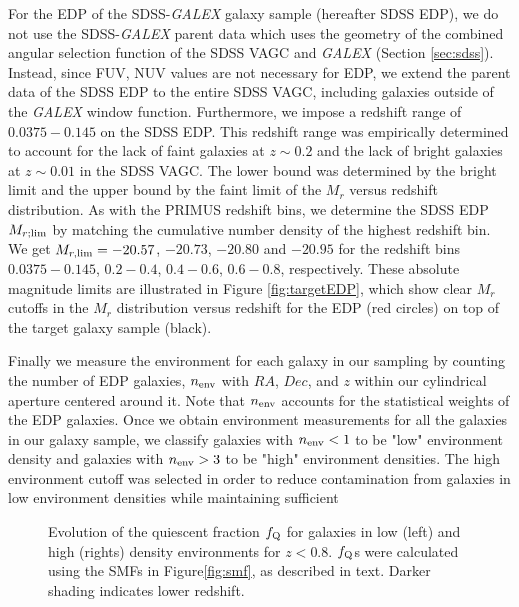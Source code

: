 \documentclass{emulateapj}
\begin{document}
For the EDP of the SDSS-{\em GALEX} galaxy sample (hereafter SDSS EDP), we do not use the SDSS-{\em GALEX} parent data which uses the geometry of the combined angular selection function of the SDSS VAGC and {\em GALEX} (Section \ref{sec:sdss}). Instead, since FUV, NUV values are not necessary for EDP, we extend the parent data of the SDSS EDP to the entire SDSS VAGC, including galaxies outside of the {\em GALEX} window function. Furthermore, we impose a redshift range of $0.0375-0.145$ on the SDSS EDP. This redshift range was empirically determined to account for the lack of faint galaxies at $z \sim 0.2$ and the lack of bright galaxies at $z \sim 0.01$ in the SDSS VAGC. The lower bound was determined by the bright limit and the upper bound by the faint limit of the $M_r$ versus redshift distribution. As with the PRIMUS redshift bins, we determine the SDSS EDP $M_{r; \rm{lim}}$ by matching the cumulative number density of the highest redshift bin. We get $M_{r,\rm{lim}} = -20.57$, $-20.73$, $-20.80$ and $-20.95$ for the redshift bins $0.0375-0.145$, $0.2-0.4$, $0.4-0.6$, $0.6-0.8$, respectively. These absolute magnitude limits are illustrated in Figure \ref{fig:targetEDP}, which show clear $M_r$ cutoffs in the $M_{r}$ distribution versus redshift for the EDP (red circles) on top of the target galaxy sample (black). 

Finally we measure the environment for each galaxy in our sampling by counting the number of EDP galaxies, $n_{\rm{env}}$ with $RA$, $Dec$, and $z$ within our cylindrical aperture centered around it. Note that $n_{\rm{env}}$ accounts for the statistical weights of the EDP galaxies. Once we obtain environment measurements for all the galaxies in our galaxy sample, we classify galaxies with $n_{\rm{env}} < 1$ to be "low" environment density and galaxies with $n_{\rm{env}} > 3$ to be "high" environment densities. The high environment cutoff was selected in order to reduce contamination from galaxies in low environment densities while maintaining sufficient 

\begin{figure*}
    \begin{center}
        \leavevmode
        \caption{Evolution of the quiescent fraction $f_{\rm{Q}}$ for galaxies in low (left) and high (rights) density environments for $z < 0.8$. $f_{\rm{Q}}$s were calculated using the SMFs in Figure\ref{fig:smf}, as described in text. Darker shading indicates lower redshift.}         \label{fig:qf}
    \end{center}
\end{figure*}
\end{document}

